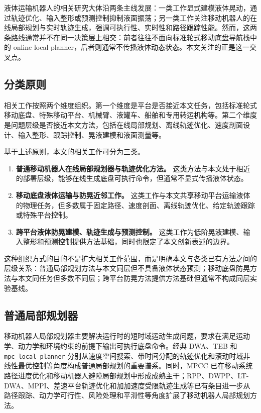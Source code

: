 \documentclass[12pt,a4paper]{ctexart}
\newcommand{\MPCC}{MPCC}
\newcommand{\DWA}{DWA}
\newcommand{\TEB}{TEB}
\newcommand{\DWPP}{DWPP}
\begin{document}
液体运输机器人的相关研究大体沿两条主线发展：一类工作显式建模液体晃动，通过轨迹优化、输入整形或预测控制抑制液面振荡；另一类工作关注移动机器人的在线局部规划与实时轨迹生成，强调可执行性、实时性和路径跟踪性能。然而，这两条路线通常并不在同一决策层上相交：前者往往不面向标准轮式移动底盘导航栈中的 online local planner，后者则通常不传播液体动态状态。本文关注的正是这一交叉点。

\subsection{分类原则}
\label{subsec:classification-principle}

相关工作按照两个维度组织。第一个维度是平台是否接近本文任务，包括标准轮式移动底盘、特殊移动平台、机械臂、液罐车、船舶和专用转运机构等。第二个维度是问题层级是否接近本文方法，包括在线局部规划、离线轨迹优化、速度剖面设计、输入整形、跟踪控制、晃液建模和液面测量等。

基于上述原则，本文的相关工作可分为三类。
\begin{enumerate}
  \item \textbf{普通移动机器人在线局部规划器与轨迹优化方法。} 这类方法与本文处于相近的部署层级，能够在线生成底盘可执行命令，但通常不显式传播液体状态。
  \item \textbf{移动底盘液体运输与防晃近邻工作。} 这类工作与本文共享移动平台运输液体的物理任务，但多数属于固定路径、速度剖面、离线轨迹优化、给定轨迹跟踪或特殊平台控制。
  \item \textbf{跨平台液体防晃建模、轨迹生成与预测控制。} 这类工作为低阶晃液建模、输入整形和预测控制提供方法基础，同时也限定了本文创新表述的边界。
\end{enumerate}

这种组织方式的目的不是扩大相关工作范围，而是明确本文与各类已有方法之间的层级关系：普通局部规划方法与本文同层但不具备液体状态预测；移动底盘防晃方法与本文同任务但多数不同层；跨平台防晃方法提供方法基础但通常不构成同层实验基线。

\subsection{普通局部规划器}
\label{subsec:ordinary-local-planners}

移动机器人局部规划器主要解决运行时的短时域运动生成问题，要求在满足运动学、动力学和环境约束的前提下输出可执行底盘命令。经典 \DWA{}、\TEB{} 和 \texttt{mpc\_local\_planner} 分别从速度空间搜索、带时间分配的轨迹优化和滚动时域非线性最优控制等角度构成普通局部规划的重要谱系\cite{D15_Fox1997,D16_Rosmann2017,D17_Rosmann2021}。同时，\MPCC{} 已在移动系统路径进度优化和移动机器人避障局部规划中形成成熟主干\cite{D19_Liniger2015,D20_Brito2019}；RPP、\DWPP{}、LT-DWA、MPPI、差速平台轨迹优化和加加速度受限轨迹生成等已有条目进一步从路径跟踪、动力学可行性、风险处理和平滑性等角度扩展了移动机器人局部规划方法\cite{D01_Macenski2023,D22_Ohnishi2026,D02_Jian2023,D03_Zhang2025,D06_Williams2017,D13_Berscheid2021}。
\end{document}
